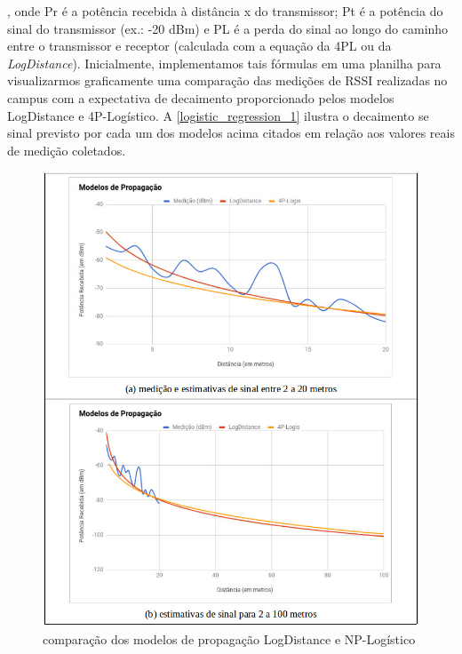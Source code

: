 \documentclass[
	12pt,				%
	openright,			%
	twoside,			%
	a4paper,			%
	english,			%
	french,				%
	spanish,			%
	brazil				%
	]{abntex2}
\begin{document}
, onde Pr é a potência recebida à distância x do transmissor; Pt é a potência do sinal do transmissor (ex.: -20 dBm) e PL é a perda do sinal ao longo do caminho entre o transmissor e receptor (calculada com a equação da 4PL ou da \textit{LogDistance}). 
Inicialmente, implementamos tais fórmulas em uma planilha para visualizarmos graficamente uma comparação das medições de RSSI realizadas no campus com a expectativa de decaimento proporcionado pelos modelos LogDistance e 4P-Logístico. A \autoref{logistic_regression_1} ilustra o decaimento se sinal previsto por cada um dos modelos acima citados em relação aos valores reais de medição coletados.

\begin{figure}[htb]
	\caption{\label{modelos_propagacao} comparação dos modelos de propagação LogDistance e NP-Logístico}
	\begin{center}
		\includegraphics[scale=0.6]{images/modelos-propagacao.jpg}
	\end{center}
\end{figure}
\end{document}
